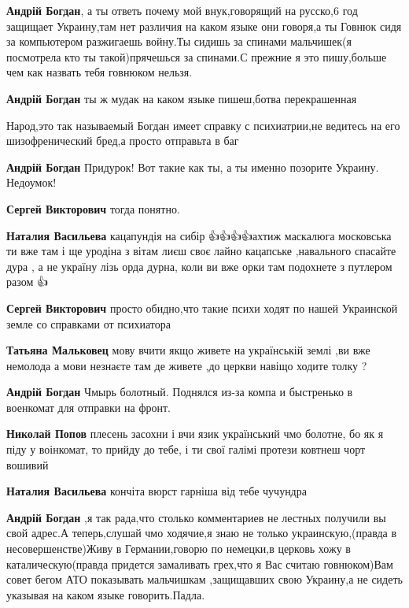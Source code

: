 \begin{itemize}
\begin{itemize}
\textbf{Андрій Богдан}, а ты ответь почему мой внук,говорящий на русско,6 год
защищает Украину,там нет различия на каком языке они говоря,а ты Говнюк сидя за
компьютером разжигаешь войну.Ты сидишь за спинами мальчишек(я посмотрела кто ты
такой)прячешься за спинами.С прежние я это пишу,больше чем как назвать тебя
говнюком нельзя.

\textbf{Андрій Богдан} ты ж мудак на каком языке пишеш,ботва перекрашенная

Народ,это так называемый Богдан имеет справку с психиатрии,не ведитесь на его
шизофренический бред,а просто отправьта в баг

\textbf{Андрій Богдан} Придурок! Вот такие как ты, а ты именно позорите Украину. Недоумок!

\textbf{Сергей Викторович} тогда понятно.

\textbf{Наталия Васильева} кацапундія на сибір \Laughey[1.0]\Laughey[1.0]\Laughey[1.0]👍👍👍👍ахтиж маскалюга
московська ти вже там і ще уродіна з вітам лиєш своє лайно кацапське
,навального спасайте дура , а не україну лізь орда дурна, коли ви вже орки там
подохнете з путлером разом \Laughey[1.0]\Laughey[1.0]\Laughey[1.0]👍

\textbf{Сергей Викторович} просто обидно,что такие психи ходят по нашей Украинской земле со справками от психиатора

\textbf{Татьяна Мальковец} мову вчити якщо живете на українській землі ,ви вже немолода а мови незнаєте там де живете ,до церкви навіщо ходите толку ?

\textbf{Андрій Богдан} Чмырь болотный. Поднялся из-за компа и быстренько в военкомат для отправки на фронт.

\textbf{Николай Попов} плесень засохни і вчи язик український чмо болотне, бо як я піду у воінкомат, то прийду до тебе, і ти свої галімі протези ковтнеш чорт вошивий \Laughey[1.0]\Laughey[1.0]\Laughey[1.0]\Laughey[1.0]\Laughey[1.0]

\textbf{Наталия Васильева} кончіта вюрст гарніша від тебе чучундра \Laughey[1.0]\Laughey[1.0]\Laughey[1.0]\Laughey[1.0]

\textbf{Андрій Богдан} ,я так рада,что столько комментариев не лестных получили вы свой адрес.А теперь,слушай чмо ходячие,я знаю не только украинскую,(правда в несовершенстве)Живу в Германии,говорю по немецки,в церковь хожу в каталическую(правда придется замаливать грех,что я Вас считаю говнюком)Вам совет бегом АТО показывать мальчишкам ,защищавших свою Украину,а не сидеть указывая на каком языке говорить.Падла.


\end{itemize}
\end{itemize}
